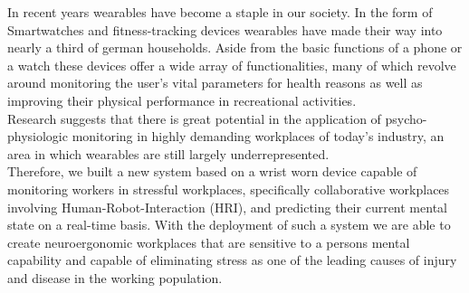 
In recent years wearables have become a staple in our society. In the form of Smartwatches and fitness-tracking devices wearables have made their way into nearly a third of german households. Aside from the basic functions of a phone or a watch these devices offer a wide array of functionalities, many of which revolve around monitoring the user's vital parameters for health reasons as well as improving their physical performance in recreational activities. \\
Research suggests that there is great potential in the application of psycho-physiologic monitoring in highly demanding workplaces of today's industry, an area in which wearables are still largely underrepresented. \\
Therefore, we built a new system based on a wrist worn device capable of monitoring workers in stressful workplaces, specifically collaborative workplaces involving Human-Robot-Interaction (HRI), and predicting their current mental state on a real-time basis. 
With the deployment of such a system we are able to create neuroergonomic workplaces that are sensitive to a persons mental capability and capable of eliminating stress as one of the leading causes of injury and disease in the working population.

